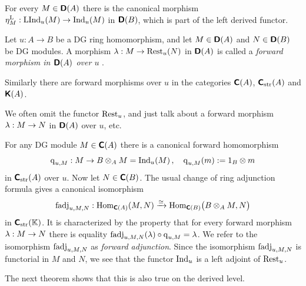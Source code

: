 For every $M \in \boldsymbol{\mathsf{D}}(A)$ there is the canonical morphism 
$\eta^{\mathrm{L}}_{M} : \operatorname{LInd}_u(M) \to \operatorname{Ind}_u(M)$
in $\boldsymbol{\mathsf{D}}(B)$, which is part of the left derived functor. 

\begin{dfn} \label{dfn:3111}
Let $u : A \to B$ be a DG ring homomorphism, and let 
$M \in \boldsymbol{\mathsf{D}}(A)$ and $N \in \boldsymbol{\mathsf{D}}(B)$ be DG modules.
A morphism
$\lambda : M \to \operatorname{Rest}_u(N)$
in $\boldsymbol{\mathsf{D}}(A)$ is called a 
{\em forward morphism in $\boldsymbol{\mathsf{D}}(A)$  over $u$}%
.

Similarly there are forward morphisms over $u$ in the categories 
$\boldsymbol{\mathsf{C}}(A)$, $\boldsymbol{\mathsf{C}}_{\mathrm{str}}(A)$ and $\boldsymbol{\mathsf{K}}(A)$.
\end{dfn}

We often omit the functor $\operatorname{Rest}_u$, and just talk about a 
forward morphism $\lambda : M \to N$ in $\boldsymbol{\mathsf{D}}(A)$ over $u$, etc. 

For any DG module $M \in \boldsymbol{\mathsf{C}}(A)$ there is a canonical forward homomorphism
\begin{equation} \label{eqn:3194}
\operatorname{q}_{u, M} : M \to B \otimes_A M = \operatorname{Ind}_u(M) \, , \quad 
\operatorname{q}_{u, M}(m) := 1_B \otimes m 
\end{equation}
in $\boldsymbol{\mathsf{C}}_{\mathrm{str}}(A)$ over $u$. 
Now let $N \in \boldsymbol{\mathsf{C}}(B)$. The usual change of ring adjunction formula gives 
a 
canonical isomorphism 
\begin{equation} \label{eqn:2401}
\operatorname{fadj}_{u, M, N} : 
\operatorname{Hom}_{\boldsymbol{\mathsf{C}}(A)}(M, N) \xrightarrow{\simeq} 
\operatorname{Hom}_{\boldsymbol{\mathsf{C}}(B)} \bigl( B \otimes_A M, N  \bigr) 
\end{equation}
in $\boldsymbol{\mathsf{C}}_{\mathrm{str}}(\mathbb{K})$. It is characterized by the property that 
for every forward morphism $\lambda : M \to N$ there is equality 
$\operatorname{fadj}_{u, M, N}(\lambda) \circ \operatorname{q}_{u, M} = \lambda$.
We refer to the isomorphism $\operatorname{fadj}_{u, M, N}$ as 
{\em forward adjunction}. 
Since the iso\-morphism $\operatorname{fadj}_{u, M, N}$ is functorial in 
$M$ and $N$, we see that the functor $\operatorname{Ind}_u$ is a left adjoint of 
$\operatorname{Rest}_u$. 

The next theorem shows that this is also true on the derived level. 

